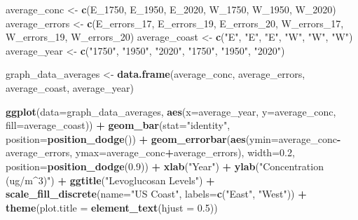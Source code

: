 \documentclass[]{article}
\newenvironment{Shaded}{\begin{snugshade}}{\end{snugshade}}
\newcommand{\KeywordTok}[1]{\textcolor[rgb]{0.13,0.29,0.53}{\textbf{#1}}}
\newcommand{\DataTypeTok}[1]{\textcolor[rgb]{0.13,0.29,0.53}{#1}}
\newcommand{\DecValTok}[1]{\textcolor[rgb]{0.00,0.00,0.81}{#1}}
\newcommand{\FloatTok}[1]{\textcolor[rgb]{0.00,0.00,0.81}{#1}}
\newcommand{\StringTok}[1]{\textcolor[rgb]{0.31,0.60,0.02}{#1}}
\newcommand{\OperatorTok}[1]{\textcolor[rgb]{0.81,0.36,0.00}{\textbf{#1}}}
\newcommand{\NormalTok}[1]{#1}
\begin{document}
\begin{Shaded}
\begin{Highlighting}[]
\NormalTok{average_conc <-}\StringTok{ }\KeywordTok{c}\NormalTok{(E_}\DecValTok{1750}\NormalTok{, E_}\DecValTok{1950}\NormalTok{, E_}\DecValTok{2020}\NormalTok{, W_}\DecValTok{1750}\NormalTok{, W_}\DecValTok{1950}\NormalTok{, W_}\DecValTok{2020}\NormalTok{)}
\NormalTok{average_errors <-}\StringTok{ }\KeywordTok{c}\NormalTok{(E_errors_}\DecValTok{17}\NormalTok{, E_errors_}\DecValTok{19}\NormalTok{, E_errors_}\DecValTok{20}\NormalTok{, W_errors_}\DecValTok{17}\NormalTok{, W_errors_}\DecValTok{19}\NormalTok{, W_errors_}\DecValTok{20}\NormalTok{)}
\NormalTok{average_coast <-}\StringTok{ }\KeywordTok{c}\NormalTok{(}\StringTok{"E"}\NormalTok{, }\StringTok{"E"}\NormalTok{, }\StringTok{"E"}\NormalTok{, }\StringTok{"W"}\NormalTok{, }\StringTok{"W"}\NormalTok{, }\StringTok{"W"}\NormalTok{)}
\NormalTok{average_year <-}\StringTok{ }\KeywordTok{c}\NormalTok{(}\StringTok{"1750"}\NormalTok{, }\StringTok{"1950"}\NormalTok{, }\StringTok{"2020"}\NormalTok{, }\StringTok{"1750"}\NormalTok{, }\StringTok{"1950"}\NormalTok{, }\StringTok{"2020"}\NormalTok{)}

\NormalTok{graph_data_averages <-}\StringTok{ }\KeywordTok{data.frame}\NormalTok{(average_conc, average_errors, average_coast, average_year)}

\KeywordTok{ggplot}\NormalTok{(}\DataTypeTok{data=}\NormalTok{graph_data_averages, }\KeywordTok{aes}\NormalTok{(}\DataTypeTok{x=}\NormalTok{average_year, }\DataTypeTok{y=}\NormalTok{average_conc, }\DataTypeTok{fill=}\NormalTok{average_coast)) }\OperatorTok{+}
\StringTok{  }\KeywordTok{geom_bar}\NormalTok{(}\DataTypeTok{stat=}\StringTok{"identity"}\NormalTok{, }\DataTypeTok{position=}\KeywordTok{position_dodge}\NormalTok{()) }\OperatorTok{+}
\StringTok{  }\KeywordTok{geom_errorbar}\NormalTok{(}\KeywordTok{aes}\NormalTok{(}\DataTypeTok{ymin=}\NormalTok{average_conc}\OperatorTok{-}\NormalTok{average_errors, }\DataTypeTok{ymax=}\NormalTok{average_conc}\OperatorTok{+}\NormalTok{average_errors), }\DataTypeTok{width=}\FloatTok{0.2}\NormalTok{, }\DataTypeTok{position=}\KeywordTok{position_dodge}\NormalTok{(}\FloatTok{0.9}\NormalTok{)) }\OperatorTok{+}
\StringTok{  }\KeywordTok{xlab}\NormalTok{(}\StringTok{"Year"}\NormalTok{) }\OperatorTok{+}
\StringTok{  }\KeywordTok{ylab}\NormalTok{(}\StringTok{"Concentration (ug/m^3)"}\NormalTok{) }\OperatorTok{+}
\StringTok{  }\KeywordTok{ggtitle}\NormalTok{(}\StringTok{"Levoglucosan Levels"}\NormalTok{) }\OperatorTok{+}
\StringTok{  }\KeywordTok{scale_fill_discrete}\NormalTok{(}\DataTypeTok{name=}\StringTok{"US Coast"}\NormalTok{, }\DataTypeTok{labels=}\KeywordTok{c}\NormalTok{(}\StringTok{"East"}\NormalTok{, }\StringTok{"West"}\NormalTok{)) }\OperatorTok{+}
\StringTok{  }\KeywordTok{theme}\NormalTok{(}\DataTypeTok{plot.title =} \KeywordTok{element_text}\NormalTok{(}\DataTypeTok{hjust =} \FloatTok{0.5}\NormalTok{))}
\end{Highlighting}
\end{Shaded}
\end{document}
